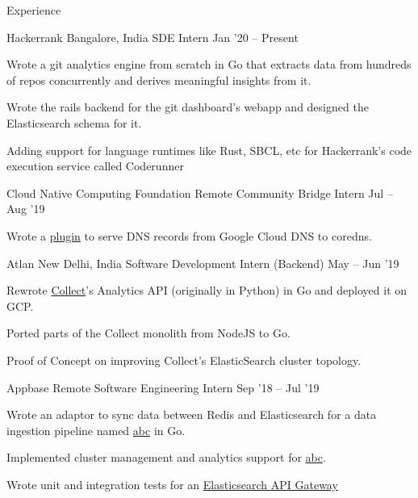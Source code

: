 \documentclass{resume} %
\begin{document}
\begin{rSection}{Experience}
  \begin{rWorkSection}{Hackerrank}
                      {Bangalore, India}
                      {SDE Intern}
                      {Jan '20 -- Present}
  {
    \item Wrote a git analytics engine from scratch in Go that extracts data from hundreds of repos concurrently and derives meaningful insights from it.
    \item Wrote the rails backend for the git dashboard's webapp and designed the Elasticsearch schema for it.
    \item Adding support for language runtimes like Rust, SBCL, etc for Hackerrank's code execution service called Coderunner
  }
  \end{rWorkSection}
  \begin{rWorkSection}{Cloud Native Computing Foundation}
                      {Remote}
                      {Community Bridge Intern}
                      {Jul -- Aug '19}
  {
    \item Wrote a \href{https://github.com/coredns/coredns/pull/3011}{plugin} to serve DNS records from Google Cloud DNS to coredns.
  }
  \end{rWorkSection}

  \begin{rWorkSection}{Atlan}
                     {New Delhi, India}
                     {Software Development Intern (Backend)}
                     {May -- Jun '19}
  {
    \item Rewrote \href{https://collect.atlan.com/}{Collect}'s Analytics API (originally in Python) in Go and deployed it on GCP.
    \item Ported parts of the Collect monolith from NodeJS to Go.
    \item Proof of Concept on improving Collect's ElasticSearch cluster topology.
  }
  \end{rWorkSection}

  \begin{rWorkSection}{Appbase}
                     {Remote}
                     {Software Engineering Intern}
                     {Sep '18 -- Jul '19}
  {
    \item Wrote an adaptor to sync data between Redis and Elasticsearch for a data ingestion pipeline named \href{http://github.com/appbaseio/abc/}{abc} in Go.
    \item Implemented cluster management and analytics support for \href{http://github.com/appbaseio/abc/}{abc}.
    \item Wrote unit and integration tests for an \href{https://github.com/appbaseio/arc}{Elasticsearch API Gateway}
  }
  \end{rWorkSection}
  

\end{rSection}
\end{document}
